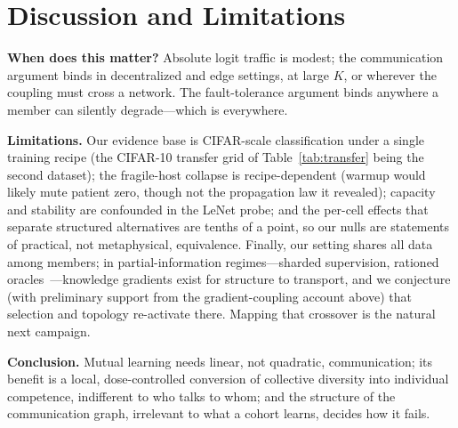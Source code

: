 \documentclass[10pt,twocolumn]{article}
\begin{document}
\section{Discussion and Limitations}

\textbf{When does this matter?} Absolute logit traffic is modest; the
communication argument binds in decentralized and edge settings, at large
$K$, or wherever the coupling must cross a network. The fault-tolerance
argument binds anywhere a member can silently degrade---which is everywhere.

\textbf{Limitations.} Our evidence base is CIFAR-scale classification under
a single training recipe (the CIFAR-10 transfer grid of
Table~\ref{tab:transfer} being the second dataset); the fragile-host collapse is recipe-dependent
(warmup would likely mute patient zero, though not the propagation law it
revealed); capacity and stability are confounded in the LeNet probe; and the
per-cell effects that separate structured alternatives are tenths of a
point, so our nulls are statements of practical, not metaphysical,
equivalence. Finally, our setting shares all data among members; in
partial-information regimes---sharded supervision, rationed
oracles~\citep{beikihassan2023resource}---knowledge gradients exist for
structure to transport, and we conjecture (with preliminary support from the
gradient-coupling account above) that selection and topology re-activate
there. Mapping that crossover is the natural next campaign.

\textbf{Conclusion.} Mutual learning needs linear, not quadratic,
communication; its benefit is a local, dose-controlled conversion of
collective diversity into individual competence, indifferent to who talks to
whom; and the structure of the communication graph, irrelevant to what a
cohort learns, decides how it fails.



\end{document}
